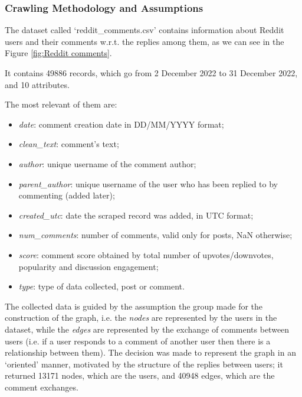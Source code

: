 \documentclass[sigchi]{acmart}
\begin{document}
\subsubsection{Crawling Methodology and Assumptions} 
The dataset called `reddit\_comments.csv' contains information about Reddit users and their comments w.r.t. the replies among them, as we can see in the Figure \ref{fig:Reddit comments}. 

It contains 49886 records, which go from 2 December 2022 to 31 December 2022, and 10 attributes.

\noindent The most relevant of them are:
\begin{itemize}
    \item \textit{date}: comment creation date in DD/MM/YYYY format;
    \item \textit{clean\_text}: comment's text;
    \item \textit{author}: unique username of the comment author;
    \item \textit{parent\_author}: unique username of the user who has been replied to by commenting (added later);
    \item \textit{created\_utc}: date the scraped record was added, in UTC format;
    \item \textit{num\_comments}: number of comments, valid only for posts, NaN otherwise;
    \item \textit{score}: comment score obtained by total number of upvotes/downvotes, popularity and discussion engagement;
    \item \textit{type}: type of data collected, post or comment.
\end{itemize}

\noindent The collected data is guided by the assumption the group made for the construction of the graph, i.e. the \textit{nodes} are represented by the users in the dataset, while the \textit{edges} are represented by the exchange of comments between users (i.e. if a user responds to a comment of another user then there is a relationship between them).
The decision was made to represent the graph in an `oriented' manner, motivated by the structure of the replies between users; it returned 13171 nodes, which are the users, and 40948 edges, which are the comment exchanges.
\end{document}
